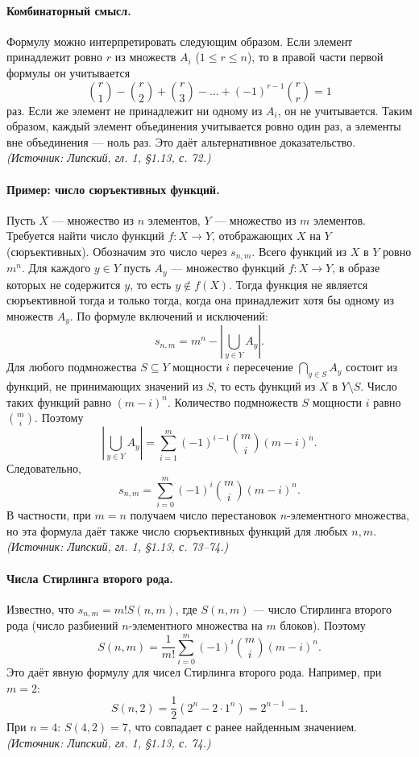 \documentclass[a4paper,12pt]{article}
\begin{document}
\paragraph{Комбинаторный смысл.}
Формулу можно интерпретировать следующим образом. Если элемент принадлежит ровно \(r\) из множеств \(A_i\) (\(1\le r\le n\)), то в правой части первой формулы он учитывается
\[
\binom{r}{1} - \binom{r}{2} + \binom{r}{3} - \dots + (-1)^{r-1}\binom{r}{r} = 1
\]
раз. Если же элемент не принадлежит ни одному из \(A_i\), он не учитывается. Таким образом, каждый элемент объединения учитывается ровно один раз, а элементы вне объединения — ноль раз. Это даёт альтернативное доказательство.
\textit{(Источник: Липский, гл. 1, §1.13, с. 72.)}

\paragraph{Пример: число сюръективных функций.}
Пусть \(X\) — множество из \(n\) элементов, \(Y\) — множество из \(m\) элементов. Требуется найти число функций \(f:X\to Y\), отображающих \(X\) на \(Y\) (сюръективных). Обозначим это число через \(s_{n,m}\). Всего функций из \(X\) в \(Y\) ровно \(m^n\). Для каждого \(y\in Y\) пусть \(A_y\) — множество функций \(f:X\to Y\), в образе которых не содержится \(y\), то есть \(y\notin f(X)\). Тогда функция не является сюръективной тогда и только тогда, когда она принадлежит хотя бы одному из множеств \(A_y\). По формуле включений и исключений:
\[
s_{n,m} = m^n - \left|\bigcup_{y\in Y} A_y\right|.
\]
Для любого подмножества \(S\subseteq Y\) мощности \(i\) пересечение \(\bigcap_{y\in S} A_y\) состоит из функций, не принимающих значений из \(S\), то есть функций из \(X\) в \(Y\setminus S\). Число таких функций равно \((m-i)^n\). Количество подмножеств \(S\) мощности \(i\) равно \(\binom{m}{i}\). Поэтому
\[
\left|\bigcup_{y\in Y} A_y\right|
=
\sum_{i=1}^{m} (-1)^{i-1} \binom{m}{i} (m-i)^n.
\]
Следовательно,
\[
s_{n,m} = \sum_{i=0}^{m} (-1)^i \binom{m}{i} (m-i)^n.
\]
В частности, при \(m=n\) получаем число перестановок \(n\)-элементного множества, но эта формула даёт также число сюръективных функций для любых \(n,m\).
\textit{(Источник: Липский, гл. 1, §1.13, с. 73--74.)}

\paragraph{Числа Стирлинга второго рода.}
Известно, что \(s_{n,m} = m! S(n,m)\), где \(S(n,m)\) — число Стирлинга второго рода (число разбиений \(n\)-элементного множества на \(m\) блоков). Поэтому
\[
S(n,m) = \frac{1}{m!} \sum_{i=0}^{m} (-1)^i \binom{m}{i} (m-i)^n.
\]
Это даёт явную формулу для чисел Стирлинга второго рода. Например, при \(m=2\):
\[
S(n,2) = \frac{1}{2}\left(2^n - 2\cdot 1^n\right) = 2^{n-1} - 1.
\]
При \(n=4\): \(S(4,2)=7\), что совпадает с ранее найденным значением.
\textit{(Источник: Липский, гл. 1, §1.13, с. 74.)}
\end{document}
